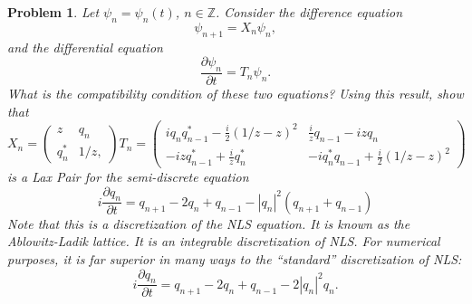 \documentclass[12pt]{report}
\newtheorem{problem}{Problem}
\newcommand{\pp}[2]{\frac{\partial #1}{\partial #2}} %
\begin{document}
\newpage



\begin{problem}
    Let $\psi_n=\psi_n(t)$, $n\in \mathbb{Z}$.
Consider the difference equation
$$
\psi_{n+1}=X_n \psi_n,
$$
and the differential equation
$$
\pp{\psi_n}{t}=T_n\psi_n.
$$
What is the compatibility condition of these two equations? Using this result,
show that
$$
X_n=\begin{pmatrix}
    z & q_n\\
    q^*_n & 1/z,
\end{pmatrix}
T_n=\begin{pmatrix}
    i q_n q^*_{n-1}-\frac{i}{2}\left(1/z-z\right)^2&
    \frac{i}{z}q_{n-1}-izq_n\\
    -izq^*_{n-1}+\frac{i}{z}q^*_n&
    -i q^*_n q_{n-1}+\frac{i}{2}\left(1/z-z\right)^2
\end{pmatrix}
$$
is a Lax Pair for the semi-discrete equation
$$
i \pp{q_n}{t}=q_{n+1}-2q_n+q_{n-1}-|q_n|^2 (q_{n+1}+q_{n-1})
$$
Note that this is a discretization of the NLS equation. It is known as the
Ablowitz-Ladik lattice. It is an integrable discretization of NLS. For numerical
purposes, it is far superior in many ways to the ``standard'' discretization of
NLS:
$$
i \pp{q_n}{t}=q_{n+1}-2q_n+q_{n-1}-2|q_n|^2 q_n.
$$
\end{problem}
\end{document}
